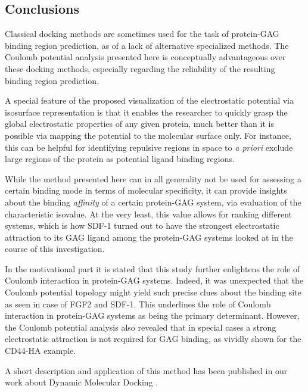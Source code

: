 \subsection{Conclusions}
\label{bspred:general_conclusions}

Classical docking methods are sometimes used for the task of protein-GAG binding
region prediction, as of a lack of alternative specialized methods. The Coulomb
potential analysis presented here is conceptually advantageous over these
docking methods, especially regarding the reliability of the resulting binding
region prediction.

A special feature of the proposed visualization of the electrostatic potential
via isosurface representation is that it enables the researcher to quickly grasp
the global electrostatic properties of any given protein, much better than it is
possible via mapping the potential to the molecular surface only. For instance,
this can be helpful for identifying repulsive regions in space to \textit{a
priori} exclude large regions of the protein as potential ligand binding
regions.

While the method presented here can in all generality not be used for assessing
a certain binding mode in terms of molecular specificity, it can provide
insights about the binding \textit{affinity} of a certain protein-GAG system,
via evaluation of the characteristic isovalue. At the very least, this value
allows for ranking different systems, which is how SDF-1 turned out to have the
strongest electrostatic attraction to its GAG ligand among the protein-GAG
systems looked at in the course of this investigation.

In the motivational part it is stated that this study further enlightens the
role of Coulomb interaction in protein-GAG systems. Indeed, it was unexpected
that the Coulomb potential topology might yield such precise clues about the
binding site as seen in case of FGF2 and SDF-1. This underlines the role of
Coulomb interaction in protein-GAG systems as being the primary determinant.
However, the Coulomb potential analysis also revealed that in special cases a
strong electrostatic attraction is not required for GAG binding, as vividly
shown for the CD44-HA example.

A short description and application of this method has been published in our
work about Dynamic Molecular Docking \cite{dmd_samsonov_gehrcke_2014}.


